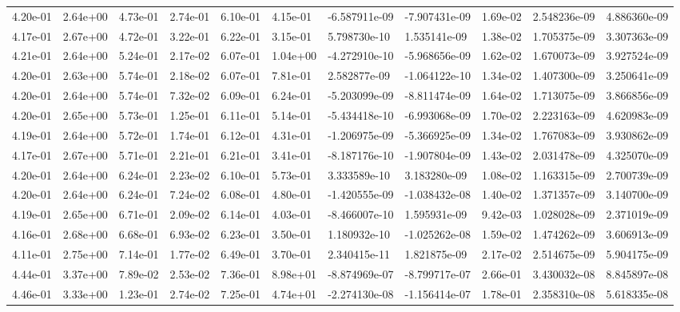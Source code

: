\begin{longtable}{| p{} | p{} |}
4.20e-01 & 2.64e+00 & 4.73e-01 & 2.74e-01 & 6.10e-01 & 4.15e-01 & -6.587911e-09 & -7.907431e-09 &  1.69e-02 &  2.548236e-09 &  4.886360e-09 \\
4.17e-01 & 2.67e+00 & 4.72e-01 & 3.22e-01 & 6.22e-01 & 3.15e-01 &  5.798730e-10 &  1.535141e-09 &  1.38e-02 &  1.705375e-09 &  3.307363e-09 \\
4.21e-01 & 2.64e+00 & 5.24e-01 & 2.17e-02 & 6.07e-01 & 1.04e+00 & -4.272910e-10 & -5.968656e-09 &  1.62e-02 &  1.670073e-09 &  3.927524e-09 \\
4.20e-01 & 2.63e+00 & 5.74e-01 & 2.18e-02 & 6.07e-01 & 7.81e-01 &  2.582877e-09 & -1.064122e-10 &  1.34e-02 &  1.407300e-09 &  3.250641e-09 \\
4.20e-01 & 2.64e+00 & 5.74e-01 & 7.32e-02 & 6.09e-01 & 6.24e-01 & -5.203099e-09 & -8.811474e-09 &  1.64e-02 &  1.713075e-09 &  3.866856e-09 \\
4.20e-01 & 2.65e+00 & 5.73e-01 & 1.25e-01 & 6.11e-01 & 5.14e-01 & -5.434418e-10 & -6.993068e-09 &  1.70e-02 &  2.223163e-09 &  4.620983e-09 \\
4.19e-01 & 2.64e+00 & 5.72e-01 & 1.74e-01 & 6.12e-01 & 4.31e-01 & -1.206975e-09 & -5.366925e-09 &  1.34e-02 &  1.767083e-09 &  3.930862e-09 \\
4.17e-01 & 2.67e+00 & 5.71e-01 & 2.21e-01 & 6.21e-01 & 3.41e-01 & -8.187176e-10 & -1.907804e-09 &  1.43e-02 &  2.031478e-09 &  4.325070e-09 \\
4.20e-01 & 2.64e+00 & 6.24e-01 & 2.23e-02 & 6.10e-01 & 5.73e-01 &  3.333589e-10 &  3.183280e-09 &  1.08e-02 &  1.163315e-09 &  2.700739e-09 \\
4.20e-01 & 2.64e+00 & 6.24e-01 & 7.24e-02 & 6.08e-01 & 4.80e-01 & -1.420555e-09 & -1.038432e-08 &  1.40e-02 &  1.371357e-09 &  3.140700e-09 \\
4.19e-01 & 2.65e+00 & 6.71e-01 & 2.09e-02 & 6.14e-01 & 4.03e-01 & -8.466007e-10 &  1.595931e-09 &  9.42e-03 &  1.028028e-09 &  2.371019e-09 \\
4.16e-01 & 2.68e+00 & 6.68e-01 & 6.93e-02 & 6.23e-01 & 3.50e-01 &  1.180932e-10 & -1.025262e-08 &  1.59e-02 &  1.474262e-09 &  3.606913e-09 \\
4.11e-01 & 2.75e+00 & 7.14e-01 & 1.77e-02 & 6.49e-01 & 3.70e-01 &  2.340415e-11 &  1.821875e-09 &  2.17e-02 &  2.514675e-09 &  5.904175e-09 \\
4.44e-01 & 3.37e+00 & 7.89e-02 & 2.53e-02 & 7.36e-01 & 8.98e+01 & -8.874969e-07 & -8.799717e-07 &  2.66e-01 &  3.430032e-08 &  8.845897e-08 \\
4.46e-01 & 3.33e+00 & 1.23e-01 & 2.74e-02 & 7.25e-01 & 4.74e+01 & -2.274130e-08 & -1.156414e-07 &  1.78e-01 &  2.358310e-08 &  5.618335e-08 \\

\end{longtable}
